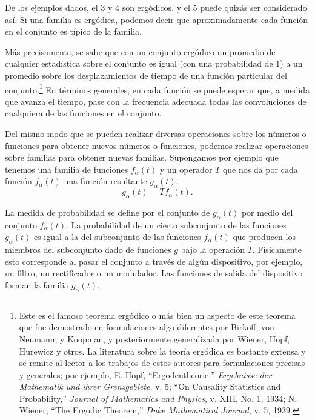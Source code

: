 De los ejemplos dados, el 3 y 4 son erg\'odicos, y el 5 puede quiz\'as
ser considerado as\'i. Si una familia es erg\'odica, podemos decir que
aproximadamente cada funci\'on en el conjunto es t\'ipico de la
familia.

M\'as precisamente, se sabe que con un conjunto erg\'odico un promedio
de cualquier estad\'istica sobre el conjunto es igual (con una
probabilidad de 1) a un promedio sobre los desplazamientos de tiempo
de una funci\'on particular del conjunto.\footnote[3]{Este es el
famoso teorema erg\'odico o m\'as bien un aspecto de este teorema que
fue demostrado en formulaciones algo diferentes por Birkoff, von
Neumann, y Koopman, y posteriormente generalizada por Wiener, Hopf,
Hurewicz y otros. La literatura sobre la teor\'ia erg\'odica es
bastante extensa y se remite al lector a los trabajos de estos autores
para formulaciones precisas y generales; por ejemplo, E. Hopf,
``Ergodentheorie,'' {\em Ergebnisse der Mathematik und ihrer
Grenzgebiete}, v. 5; ``On Causality Statistics and Probability,'' {\em
Journal of Mathematics and Physics}, v. XIII, No. 1, 1934; N. Wiener,
``The Ergodic Theorem,'' {\em Duke Mathematical Journal}, v. 5, 1939.}
En t\'erminos generales, en cada funci\'on se puede esperar que, a
medida que avanza el tiempo, pase con la frecuencia adecuada todas las
convoluciones de cualquiera de las funciones en el conjunto.

Del mismo modo que se pueden realizar diversas operaciones sobre los
n\'umeros o funciones para obtener nuevos n\'umeros o funciones,
podemos realizar operaciones sobre familias para obtener nuevas
familias. Supongamos por ejemplo que tenemos una familia de funciones
$f_{\alpha}(t)$ y un operador $T$ que nos da por cada funci\'on
$f_{\alpha}(t)$ una funci\'on resultante $g_{\alpha}(t)$:
\begin{equation}
  g_{\alpha}(t) = Tf_{\alpha}(t).
\end{equation}

La medida de probabilidad se define por el conjunto de $g_{\alpha}(t)$
por medio del conjunto $f_{\alpha}(t)$. La probabilidad de un cierto
subconjunto de las funciones $g_{\alpha}(t)$ es igual a la del
subconjunto de las funciones $f_{\alpha}(t)$ que producen los miembros
del subconjunto dado de funciones $g$ bajo la operaci\'on
$T$. F\'isicamente esto corresponde al pasar el conjunto a trav\'es de
alg\'un dispositivo, por ejemplo, un filtro, un rectificador o un
modulador. Las funciones de salida del dispositivo forman la familia
$g_{\alpha}(t)$.

